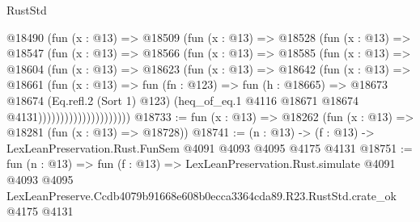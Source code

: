 \begin{lexlean}{RustStd}
\begin{coremodule}
                      @18490
                        (fun (x : @13) =>
                        @18509
                          (fun (x : @13) =>
                          @18528
                            (fun (x : @13) =>
                            @18547
                              (fun (x : @13) =>
                              @18566
                                (fun (x : @13) =>
                                @18585
                                  (fun (x : @13) =>
                                  @18604
                                    (fun (x : @13) =>
                                    @18623
                                      (fun (x : @13) =>
                                      @18642
                                        (fun (x : @13) =>
                                        @18661
                                          (fun (x : @13) =>
                                          fun (fn : @123) =>
                                          fun (h : @18665) =>
                                          @18673
                                            @18674
                                            (Eq.refl.{2} (Sort 1) @123)
                                            (heq_of_eq.{1}
                                              @4116
                                              @18671
                                              @18674
                                              @4131)))))))))))))))))))))
@18733 := fun (x : @13) => @18262 (fun (x : @13) => @18281 (fun (x : @13) => @18728))
@18741 := (n : @13) -> (f : @13) -> LexLeanPreservation.Rust.FunSem @4091 @4093 @4095 @4175 @4131
@18751 := fun (n : @13) =>
  fun (f : @13) =>
  LexLeanPreservation.Rust.simulate
    @4091
    @4093
    @4095
    LexLeanPreserve.Ccdb4079b91668e608b0ecca3364cda89.R23.RustStd.crate_ok
    @4175
    @4131
\end{coremodule}
\end{lexlean}

